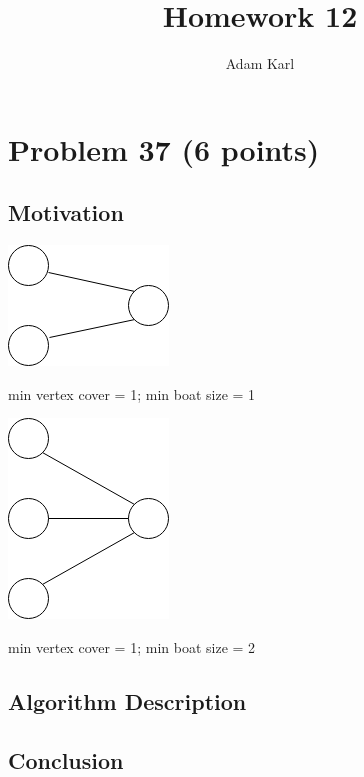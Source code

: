 \documentclass[a4paper]{article}
\title{Homework 12}
\author{Adam Karl}
\begin{document}
\maketitle

\section{Problem 37 (6 points)}
\subsection{Motivation}

\begin{center}
    \includegraphics[scale=.5]{1vc1fgab.png}
    
    \caption{min vertex cover = 1; min boat size = 1}
\end{center}

\begin{center}
    \includegraphics[scale=.5]{1vc2fgab.png}
    
    \caption{min vertex cover = 1; min boat size = 2}
\end{center}

\subsection{Algorithm Description}

\subsection{Conclusion}
\end{document}
